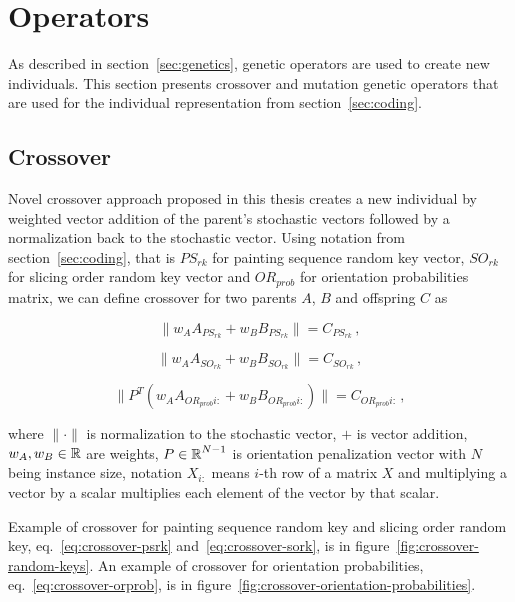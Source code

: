 \section{Operators}\label{sec:operators}
As described in section~\ref{sec:genetics}, genetic operators are used to create
new individuals.
This section presents crossover and mutation genetic operators
that are used for the individual representation from section~\ref{sec:coding}.

\subsection{Crossover}\label{subsec:crossover}

Novel crossover approach proposed in this thesis
creates a new individual by weighted vector addition of the parent's stochastic vectors followed by a normalization back to the stochastic vector.
Using notation from section~\ref{sec:coding}, that is
$PS_{rk}$ for painting sequence random key vector,
$SO_{rk}$ for slicing order random key vector and
$OR_{prob}$ for orientation probabilities matrix,
we can define crossover for two parents $A$, $B$ and offspring $C$ as

\begin{equation}
    \|w_A A_{PS_{rk}} + w_B B_{PS_{rk}}\| = C_{PS_{rk}}\,,
    \label{eq:crossover-psrk}
\end{equation}

\begin{equation}
    \|w_A A_{SO_{rk}} + w_B B_{SO_{rk}}\| = C_{SO_{rk}}\,,
    \label{eq:crossover-sork}
\end{equation}

\begin{equation}
    \|P^T(w_A A_{OR_{prob}i:} + w_B B_{OR_{prob}i:})\| = C_{OR_{prob}i:}\,,
    \label{eq:crossover-orprob}
\end{equation}

where $\|\cdot\|$ is normalization to the stochastic vector, $+$ is vector addition, $w_A, w_B \in \operatorname*{\mathbb{R}}$ are weights,
$P \in \operatorname*{\mathbb{R}}^{N-1}$ is orientation penalization vector with $N$ being instance size, notation $X_{i:}$ means $i$-th row of a matrix $X$
and multiplying a vector by a scalar multiplies each element of the vector by that scalar.

Example of crossover for painting sequence random key and slicing order random key, eq.~\ref{eq:crossover-psrk} and~\ref{eq:crossover-sork},
is in figure~\ref{fig:crossover-random-keys}.
An example of crossover for orientation probabilities, eq.~\ref{eq:crossover-orprob}, is in figure~\ref{fig:crossover-orientation-probabilities}.

